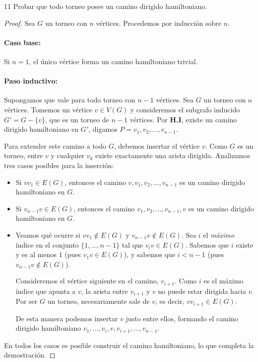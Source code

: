 \begin{ejercicioEntregar}{11}
	Probar que todo torneo posee un camino dirigido hamiltoniano.
\end{ejercicioEntregar}
\begin{proof}
	Sea \( G \) un torneo con \( n \) vértices. Procedemos por inducción sobre \( n \).

	\paragraph{Caso base:} Si \( n = 1 \), el único vértice forma un camino hamiltoniano trivial.

	\paragraph{Paso inductivo:} Supongamos que vale para todo torneo con \( n-1 \) vértices. Sea \( G \) un torneo con \( n \) vértices. Tomemos un vértice \( v \in V(G) \) y consideremos el subgrafo inducido \( G' = G - \{v\} \), que es un torneo de \( n-1 \) vértices. Por \textbf{H.I}, existe un camino dirigido hamiltoniano en \( G' \), digamos \( P = v_1, v_2, \ldots, v_{n-1} \).

	Para extender este camino a todo \( G \), debemos insertar el vértice \( v \). Como \( G \) es un torneo, entre \( v \) y cualquier \( v_k \) existe exactamente una arista dirigida. Analizamos tres casos posibles para la inserción:

	\begin{itemize}
		\item Si \( v v_1 \in E(G) \), entonces el camino \( v, v_1, v_2, \ldots, v_{n-1} \) es un camino dirigido hamiltoniano en \( G \).

		\item Si \( v_{n-1} v \in E(G) \), entonces el camino \( v_1, v_2, \ldots, v_{n-1}, v \) es un camino dirigido hamiltoniano en \( G \).

		\item Veamos qué ocurre si \( v v_1 \notin E(G) \) y \( v_{n-1} v \notin E(G) \). Sea \( i \) el \textit{máximo} índice en el conjunto \( \{1, \ldots, n-1\} \) tal que \( v_i v \in E(G) \).
		      Sabemos que \( i \) existe y es al menos \( 1 \) (pues \( v_1 v \in E(G) \)), y sabemos que \( i < n-1 \) (pues \( v_{n-1} v \notin E(G) \)).

		      Consideremos el vértice siguiente en el camino, \( v_{i+1} \). Como \( i \) es el máximo índice que apunta a \( v \), la arista entre \( v_{i+1} \) y \( v \) no puede estar dirigida hacia \( v \). Por ser \( G \) un torneo, necesariamente sale de \( v \), es decir, \( v v_{i+1} \in E(G) \).

		      De esta manera podemos insertar \( v \) justo entre ellos, formando el camino dirigido hamiltoniano \( v_1, \ldots, v_i, v, v_{i+1}, \ldots, v_{n-1} \).
	\end{itemize}

	En todos los casos es posible construir el camino hamiltoniano, lo que completa la demostración.
\end{proof}

